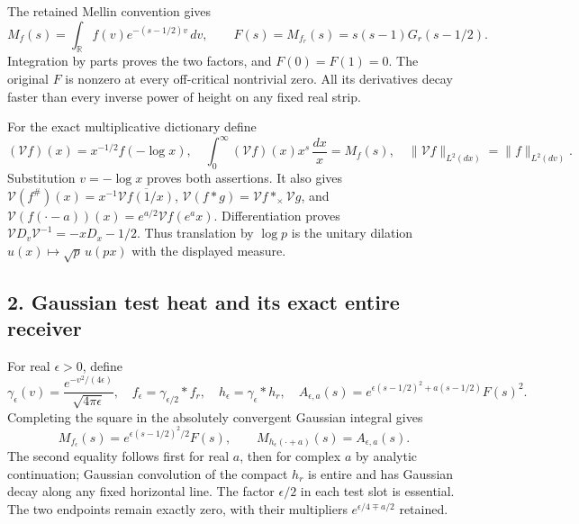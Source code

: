 \documentclass[
  10pt,
  a4paper,
]{article}
\begin{document}
The retained Mellin convention gives \[
M_f(s)=\int_{\mathbb R}f(v)e^{-(s-1/2)v}\,dv,\qquad
F(s)=M_{f_r}(s)=s(s-1)G_r(s-1/2).
\tag{OZG4}
\] Integration by parts proves the two factors, and \(F(0)=F(1)=0\). The
original \(F\) is nonzero at every off-critical nontrivial zero. All its
derivatives decay faster than every inverse power of height on any fixed
real strip.

For the exact multiplicative dictionary define \[
(\mathcal V f)(x)=x^{-1/2}f(-\log x),\quad
\int_0^\infty(\mathcal V f)(x)x^s\,\frac{dx}{x}=M_f(s),\quad
\|\mathcal V f\|_{L^2(dx)}=\|f\|_{L^2(dv)}.
\tag{OZG5}
\] Substitution \(v=-\log x\) proves both assertions. It also gives
\(\mathcal V(f^\#)(x)=x^{-1}\overline{\mathcal V f(1/x)}\),
\(\mathcal V(f*g)=\mathcal V f *_\times\mathcal V g\), and
\(\mathcal V(f(\cdot-a))(x)=e^{a/2}\mathcal V f(e^a x)\).
Differentiation proves \(\mathcal V D_v\mathcal V^{-1}=-xD_x-1/2\). Thus
translation by \(\log p\) is the unitary dilation
\(u(x)\mapsto\sqrt p\,u(px)\) with the displayed measure.

\subsection{2. Gaussian test heat and its exact entire
receiver}\label{gaussian-test-heat-and-its-exact-entire-receiver}

For real \(\epsilon>0\), define \[
\gamma_\epsilon(v)=\frac{e^{-v^2/(4\epsilon)}}{\sqrt{4\pi\epsilon}},
\quad f_\epsilon=\gamma_{\epsilon/2}*f_r,\quad
h_\epsilon=\gamma_\epsilon*h_r,\quad
A_{\epsilon,a}(s)=e^{\epsilon(s-1/2)^2+a(s-1/2)}F(s)^2.
\tag{OZG6}
\] Completing the square in the absolutely convergent Gaussian integral
gives \[
M_{f_\epsilon}(s)=e^{\epsilon(s-1/2)^2/2}F(s),\qquad
M_{h_\epsilon(\cdot+a)}(s)=A_{\epsilon,a}(s).
\tag{OZG7}
\] The second equality follows first for real \(a\), then for complex
\(a\) by analytic continuation; Gaussian convolution of the compact
\(h_r\) is entire and has Gaussian decay along any fixed horizontal
line. The factor \(\epsilon/2\) in each test slot is essential. The two
endpoints remain exactly zero, with their multipliers
\(e^{\epsilon/4\mp a/2}\) retained.
\end{document}
